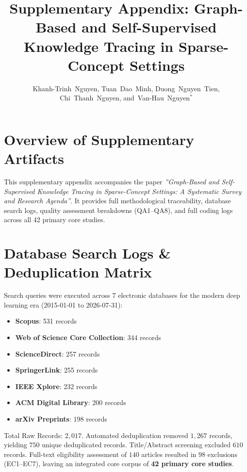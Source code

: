 \documentclass[10pt,journal,compsoc]{IEEEtran}
\begin{document}
\title{Supplementary Appendix: Graph-Based and Self-Supervised Knowledge Tracing in Sparse-Concept Settings}

\author{Khanh-Trinh~Nguyen, Tuan~Dao~Minh, Duong~Nguyen~Tien, Chi~Thanh~Nguyen, and~Van-Hau~Nguyen$^{*}$}

\maketitle

\section{Overview of Supplementary Artifacts}
This supplementary appendix accompanies the paper \textit{''Graph-Based and Self-Supervised Knowledge Tracing in Sparse-Concept Settings: A Systematic Survey and Research Agenda''}. It provides full methodological traceability, database search logs, quality assessment breakdowns (QA1--QA8), and full coding logs across all 42 primary core studies.

\section{Database Search Logs \& Deduplication Matrix}
Search queries were executed across 7 electronic databases for the modern deep learning era (2015-01-01 to 2026-07-31):
\begin{itemize}
    \item \textbf{Scopus}: 531 records
    \item \textbf{Web of Science Core Collection}: 344 records
    \item \textbf{ScienceDirect}: 257 records
    \item \textbf{SpringerLink}: 255 records
    \item \textbf{IEEE Xplore}: 232 records
    \item \textbf{ACM Digital Library}: 200 records
    \item \textbf{arXiv Preprints}: 198 records
\end{itemize}
Total Raw Records: $2,017$. Automated deduplication removed $1,267$ records, yielding $750$ unique deduplicated records. Title/Abstract screening excluded $610$ records. Full-text eligibility assessment of $140$ articles resulted in $98$ exclusions (EC1--EC7), leaving an integrated core corpus of \textbf{42 primary core studies}.
\end{document}
